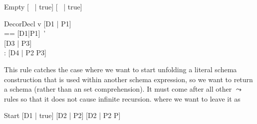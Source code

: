 \documentclass{article}
\newcommand{\unfoldsTo}{\mathrel{\leadsto}}
\begin{document}
\begin{zedrule}{Empty}
   [~ | true] \unfoldsTo [~ | true]
\end{zedrule}

\begin{zedrule}{DecorDecl}
   v \unfoldsTo [D1 | P1] \\
   \proviso [D2|P2] == [D1|P1]~' \\
   [D | true] \unfoldsTo [D3 | P3] \\
   \proviso [D2 | true] \land [D3 | true] : \power [D4]
\derives
   [v~'; D | true] \unfoldsTo [D4 | P2 \land P3]
\end{zedrule}

This rule catches the case where we want to start unfolding a
literal schema construction that is used within another
schema expression, so we want to return a schema
(rather than an set comprehension).  It must come after
all other $\unfoldsTo$ rules so that it does not cause
infinite recursion.
where we want to leave it as 
\begin{zedrule}{Start}
   [D1 | true] \unfoldsTo [D2 | P2]
\derives
   [D1 | P] \unfoldsTo [D2 | P2 \land P]
\end{zedrule}
\end{document}
